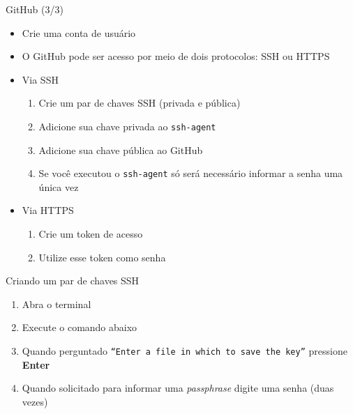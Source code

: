 \documentclass[14pt]{beamer}
\begin{document}
\begin{frame}[fragile]{GitHub (3/3)}
    \begin{itemize}
        \item Crie uma conta de usuário
        \item O GitHub pode ser acesso por meio de dois protocolos: SSH ou HTTPS
        \item Via SSH
        \begin{enumerate}
            \item Crie um par de chaves SSH (privada e pública)
            \item Adicione sua chave privada ao \texttt{ssh-agent}
            \item Adicione sua chave pública ao GitHub
            \item Se você executou o \texttt{ssh-agent} só será necessário
            informar a senha uma única vez
        \end{enumerate}
        \item Via HTTPS
        \begin{enumerate}
            \item Crie um token de acesso
            \item Utilize esse token como senha
        \end{enumerate}
    \end{itemize}
\end{frame}

\begin{frame}[fragile]{Criando um par de chaves SSH}
    \begin{enumerate}
        \item Abra o terminal
        \item Execute o comando abaixo
        \item Quando perguntado \texttt{``Enter a file in which to save the
        key''} pressione \textbf{Enter}
        \item Quando solicitado para informar uma \textit{passphrase} digite
        uma senha (duas vezes)
    \end{enumerate}
\end{frame}
\end{document}
